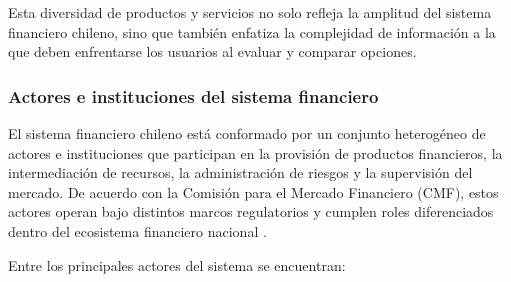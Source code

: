 \documentclass[
	spanish, %
	letterpaper, oneside
]{book}
\begin{document}
Esta diversidad de productos y servicios no solo refleja la amplitud del sistema financiero chileno, sino que también enfatiza la complejidad de información a la que deben enfrentarse los usuarios al evaluar y comparar opciones.


\subsubsection{Actores e instituciones del sistema financiero}

El sistema financiero chileno está conformado por un conjunto heterogéneo de actores e instituciones que participan en la provisión de productos financieros, la intermediación de recursos, la administración de riesgos y la supervisión del mercado. De acuerdo con la Comisión para el Mercado Financiero (CMF), estos actores operan bajo distintos marcos regulatorios y cumplen roles diferenciados dentro del ecosistema financiero nacional \cite{cmf_educa_sistema}.

Entre los principales actores del sistema se encuentran:
\end{document}
